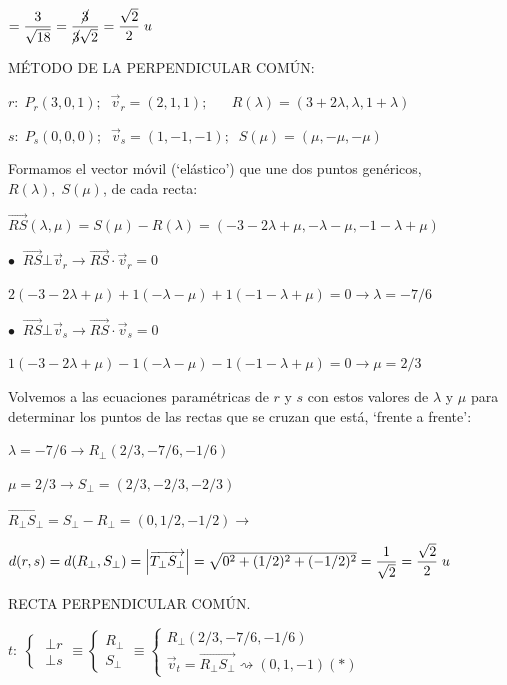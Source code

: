 \noindent $=\dfrac 3 {\sqrt{18}}=\dfrac {\cancel{3}}{\cancel{3}\sqrt{2}}=\dfrac {\sqrt{2}}{2}\; u$

\vspace{5mm}\noindent MÉTODO DE LA PERPENDICULAR COMÚN:

\vspace{3mm} \noindent $r:\; P_r(3,0,1);\;\; \vec v_r=(2,1,1);\;\; \;\;\;\;R(\lambda)=(3+2\lambda,\lambda,1+\lambda)$

\noindent $s:\; P_s(0,0,0);\;\; \vec v_s=(1,-1,-1);\;\;S(\mu)=(\mu,-\mu,-\mu)$

\noindent Formamos el vector móvil (`elástico') que une dos puntos genéricos, $R(\lambda),\; S(\mu)$, de cada recta: 

\noindent $\overrightarrow{RS}(\lambda,\mu)= S(\mu)-R(\lambda)=(-3-2\lambda+\mu,-\lambda-\mu,-1-\lambda+\mu)$

\noindent $\bullet \;\; \overrightarrow{RS}\bot \vec v_r \to \overrightarrow{RS}\cdot \vec v_r=0$

\noindent $2(-3-2\lambda+\mu)+1(-\lambda-\mu)+1(-1-\lambda+\mu)=0 \to \lambda=-7/6$

\noindent $\bullet \;\; \overrightarrow{RS}\bot \vec v_s \to \overrightarrow{RS}\cdot \vec v_s=0$

\noindent  $1(-3-2\lambda+\mu)-1(-\lambda-\mu)-1(-1-\lambda+\mu)=0 \to \mu=2/3$

\noindent Volvemos a las ecuaciones paramétricas de $r$ y $s$ con estos valores de $\lambda$ y $\mu$ para determinar los puntos de las rectas que se cruzan que está, `frente a frente':

\noindent $\lambda=-7/6 \to R_\bot(2/3,-7/6,-1/6)$

\noindent $ \mu=2/3 \to S_\bot=(2/3,-2/3,-2/3)$

\noindent $\overrightarrow{R_\bot S_\bot}=S_\bot-R_\bot=(0,1/2,-1/2) \to $

\noindent $d(r,s)=d(R_\bot,S_\bot)=\abs{\overrightarrow{T_\bot S_\bot}}=\sqrt{0^2+(1/2)^2+(-1/2)^2}=\dfrac 1 {\sqrt{2}}= \dfrac {\sqrt{2}}2\; u$

\vspace{4mm} \noindent  RECTA PERPENDICULAR COMÚN.

\vspace{3mm}\noindent $t:\;\begin{cases} \;\bot r\\ \; \bot s \end{cases} \equiv \begin{cases} R_\bot \\ S_\bot \end{cases} \equiv
 \begin{cases} R_\bot(2/3,-7/6,-1/6) \\ \vec v_t=\overrightarrow{R_\bot S_\bot}\rightsquigarrow(0,1,-1) (*) \end{cases}$
 
